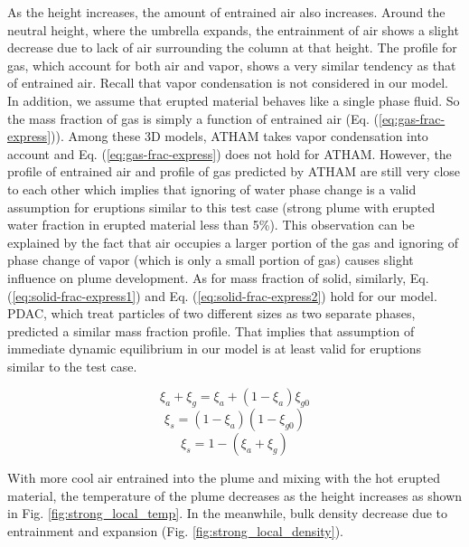 \documentclass[journal abbreviation, manuscript]{copernicus}
\begin{document}
As the height increases, the amount of entrained air also increases. Around the neutral height, where the umbrella expands, the entrainment of air shows a slight decrease due to lack of air surrounding the column at that height. The profile for gas, which account for both air and vapor, shows a very similar tendency as that of entrained air. Recall that vapor condensation is not considered in our model. In addition, we assume that erupted material behaves like a single phase fluid. So the mass fraction of gas is simply a function of entrained air (Eq. (\ref{eq:gas-frac-express})). Among these 3D models, ATHAM takes vapor condensation into account and Eq. (\ref{eq:gas-frac-express}) does not hold for ATHAM. However, the profile of entrained air and profile of gas predicted by ATHAM are still very close to each other which implies that ignoring of water phase change is a valid assumption for eruptions similar to this test case (strong plume with erupted water fraction in erupted material less than 5\%). This observation can be explained by the fact that air occupies a larger portion of the gas and ignoring of phase change of vapor (which is only a small portion of gas) causes slight influence on plume development. As for mass fraction of solid, similarly, Eq. (\ref{eq:solid-frac-express1}) and Eq. (\ref{eq:solid-frac-express2}) hold for our model. PDAC, which treat particles of two different sizes as two separate phases, predicted a similar mass fraction profile. That implies that assumption of immediate dynamic equilibrium in our model is at least valid for eruptions similar to the test case.
 
\begin{equation}
\xi_a + \xi_g = \xi_a + \left(1-\xi_a\right) \xi_{g0}
\label{eq:gas-frac-express}
\end{equation}
\begin{equation}
\xi_s = \left(1 - \xi_a\right) \left(1- \xi_{g0}\right)
\label{eq:solid-frac-express1}
\end{equation}
\begin{equation}
\xi_s = 1 - \left(\xi_a + \xi_g\right)
\label{eq:solid-frac-express2}
\end{equation}

With more cool air entrained into the plume and mixing with the hot erupted material, the temperature of the plume decreases as the height increases as shown in Fig. \ref{fig:strong_local_temp}. In the meanwhile, bulk density decrease due to entrainment and expansion (Fig. \ref{fig:strong_local_density}).
\end{document}
